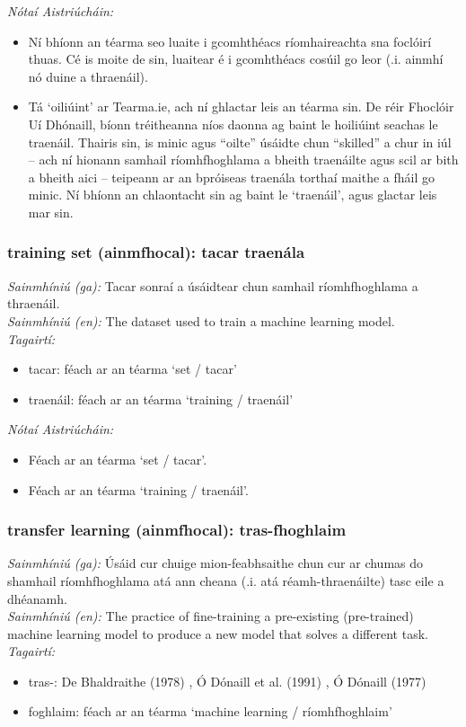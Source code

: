  \noindent \textit{Nótaí Aistriúcháin:}
\begin{itemize}
	\item Ní bhíonn an téarma seo luaite i gcomhthéacs ríomhaireachta sna foclóirí thuas. Cé is moite de sin, luaitear é i gcomhthéacs cosúil go leor (.i. ainmhí nó duine a thraenáil).
	\item Tá `oiliúint' ar Tearma.ie, ach ní ghlactar leis an téarma sin. De réir Fhoclóir Uí Dhónaill, bíonn tréitheanna níos daonna ag baint le hoiliúint seachas le traenáil. Thairis sin, is minic agus “oilte” úsáidte chun “skilled” a chur in iúl -- ach ní hionann samhail ríomhfhoghlama a bheith traenáilte agus scil ar bith a bheith aici -- teipeann ar an bpróiseas traenála torthaí maithe a fháil go minic. Ní bhíonn an chlaontacht sin ag baint le `traenáil', agus glactar leis mar sin.
\end{itemize}


\subsubsection*{training set (ainmfhocal): tacar traenála}
 \noindent \textit{Sainmhíniú (ga):} Tacar sonraí a úsáidtear chun samhail ríomhfhoghlama a thraenáil.
\\
 \noindent \textit{Sainmhíniú (en):} The dataset used to train a machine learning model.
\\
 \noindent \textit{Tagairtí:}
\begin{itemize}
	\item tacar: féach ar an téarma `set / tacar'
	\item traenáil: féach ar an téarma `training / traenáil'
\end{itemize}

 \noindent \textit{Nótaí Aistriúcháin:}
\begin{itemize}
	\item Féach ar an téarma `set / tacar'.
	\item Féach ar an téarma `training / traenáil'.
\end{itemize}


\subsubsection*{transfer learning (ainmfhocal): tras-fhoghlaim}
 \noindent \textit{Sainmhíniú (ga):} Úsáid cur chuige mion-feabhsaithe chun cur ar chumas do shamhail ríomhfhoghlama atá ann cheana (.i. atá réamh-thraenáilte) tasc eile a dhéanamh.
\\
 \noindent \textit{Sainmhíniú (en):} The practice of fine-training a pre-existing (pre-trained) machine learning model to produce a new model that solves a different task.
\\
 \noindent \textit{Tagairtí:}
\begin{itemize}
	\item tras-: De Bhaldraithe (1978) \cite{de-bhaldraithe}, Ó Dónaill et al. (1991) \cite{focloir-beag}, Ó Dónaill (1977) \cite{odonaill}
	\item foghlaim: féach ar an téarma `machine learning / ríomhfhoghlaim'
\end{itemize}

